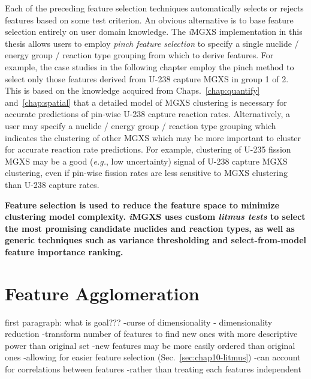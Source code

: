 Each of the preceding feature selection techniques automatically selects or rejects features based on some test criterion. An obvious alternative is to base feature selection entirely on user domain knowledge. The \textit{i}\ac{MGXS} implementation in this thesis allows users to employ \textit{pinch feature selection} to specify a single nuclide / energy group / reaction type grouping from which to derive features. For example, the case studies in the following chapter employ the pinch method to select only those features derived from U-238 capture \ac{MGXS} in group 1 of 2. This is based on the knowledge acquired from Chaps.~\ref{chap:quantify} and~\ref{chap:spatial} that a detailed model of \ac{MGXS} clustering is necessary for accurate predictions of pin-wise U-238 capture reaction rates. Alternatively, a user may specify a nuclide / energy group / reaction type grouping which indicates the clustering of other \ac{MGXS} which may be more important to cluster for accurate reaction rate predictions. For example, clustering of U-235 fission \ac{MGXS} may be a good (\textit{e.g.}, low uncertainty) signal of U-238 capture \ac{MGXS} clustering, even if pin-wise fission rates are less sensitive to \ac{MGXS} clustering than U-238 capture rates.


\begin{emphbox}
\textbf{Feature selection is used to reduce the feature space to minimize clustering model complexity. \textit{i}\ac{MGXS} uses custom \textit{litmus tests} to select the most promising candidate nuclides and reaction types, as well as generic techniques such as variance thresholding and select-from-model feature importance ranking.}
\end{emphbox}


\section{Feature Agglomeration}
\label{sec:chap10-feature-agglomerate}

first paragraph: what is goal???
-curse of dimensionality - dimensionality reduction
-transform number of features to find new ones with more descriptive power than original set
  -new features may be more easily ordered than original ones
    -allowing for easier feature selection (Sec.~\ref{sec:chap10-litmus})
-can account for correlations between features
  -rather than treating each features independent

